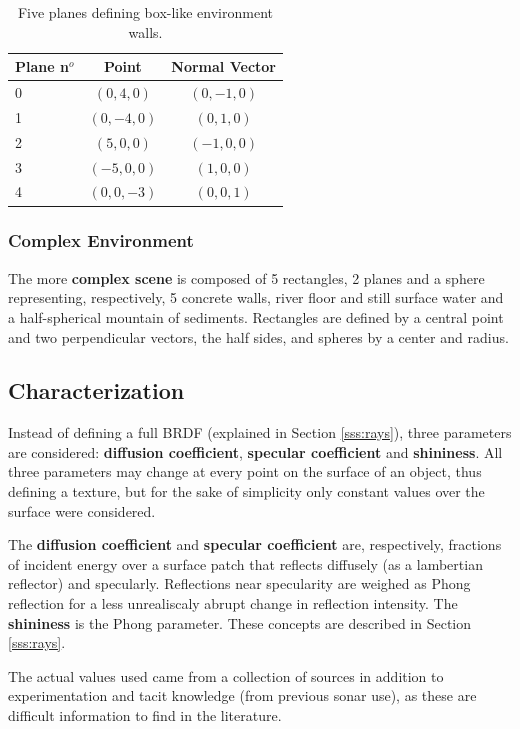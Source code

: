 \begin{table}[ht]
\centering
\begin{tabular}{lcc}
Plane n$^o$ & Point & Normal Vector \\
\hline
0 & $( 0, 4, 0)$ & $( 0,-1, 0)$  \\
1 & $( 0,-4, 0)$ & $( 0, 1, 0)$  \\
2 & $( 5, 0, 0)$ & $(-1, 0, 0)$  \\
3 & $(-5, 0, 0)$ & $( 1, 0, 0)$  \\
4 & $( 0, 0,-3)$ & $( 0, 0, 1)$  \\
\end{tabular}
\caption{Five planes defining box-like environment walls.}
\end{table}

\subsubsection{Complex Environment}
The more \textbf{complex scene} is composed of 5 rectangles, 2 planes and a sphere
representing, respectively, 5 concrete walls, river floor and still surface
water and a half-spherical mountain of sediments. Rectangles are defined by a
central point and two perpendicular vectors, the half sides, and spheres by a
center and radius.

\subsection{Characterization}
\label{ss:characterization}

Instead of defining a full BRDF (explained in Section
\ref{sss:rays}), three parameters are considered: \textbf{diffusion coefficient},
\textbf{specular coefficient} and \textbf{shininess}. All three parameters may
change at every point on the surface of an object, thus defining a texture, but
for the sake of simplicity only constant values over the surface were
considered.

The \textbf{diffusion coefficient} and \textbf{specular coefficient} are,
respectively, fractions of incident energy over a surface patch that reflects
diffusely (as a lambertian reflector) and specularly. Reflections near
specularity are weighed as Phong reflection for a less unrealiscaly abrupt
change in reflection intensity. The \textbf{shininess} is the Phong parameter.
These concepts are described in Section \ref{sss:rays}.

The actual values used came from a collection of sources in addition to
experimentation and tacit knowledge (from previous sonar use), as these are
difficult information to find in the literature.

